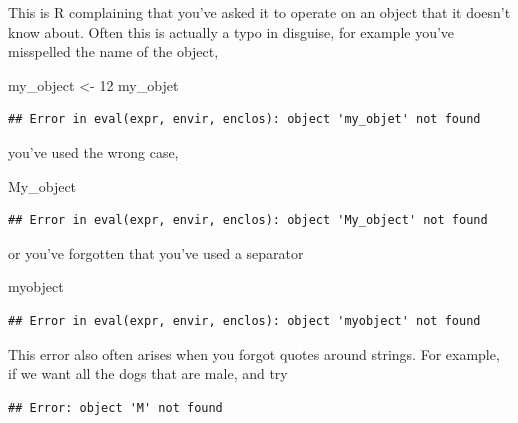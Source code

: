 \documentclass[]{Nemilov}
\newenvironment{Shaded}{\begin{snugshade}}{\end{snugshade}}
\newcommand{\DecValTok}[1]{\textcolor[rgb]{0.00,0.00,0.81}{#1}}
\newcommand{\KeywordTok}[1]{\textcolor[rgb]{0.13,0.29,0.53}{\textbf{#1}}}
\newcommand{\NormalTok}[1]{#1}
\newcommand{\OperatorTok}[1]{\textcolor[rgb]{0.81,0.36,0.00}{\textbf{#1}}}
\newcommand{\StringTok}[1]{\textcolor[rgb]{0.31,0.60,0.02}{#1}}
\begin{document}
This is R complaining that you've asked it to operate on an object that it doesn't know about. Often this is actually a typo in disguise, for example you've misspelled the name of the object,

\begin{Shaded}
\begin{Highlighting}[]
\NormalTok{my_object <-}\StringTok{ }\DecValTok{12}
\NormalTok{my_objet}
\end{Highlighting}
\end{Shaded}

\begin{verbatim}
## Error in eval(expr, envir, enclos): object 'my_objet' not found
\end{verbatim}

you've used the wrong case,

\begin{Shaded}
\begin{Highlighting}[]
\NormalTok{My_object}
\end{Highlighting}
\end{Shaded}

\begin{verbatim}
## Error in eval(expr, envir, enclos): object 'My_object' not found
\end{verbatim}

or you've forgotten that you've used a separator

\begin{Shaded}
\begin{Highlighting}[]
\NormalTok{myobject}
\end{Highlighting}
\end{Shaded}

\begin{verbatim}
## Error in eval(expr, envir, enclos): object 'myobject' not found
\end{verbatim}

This error also often arises when you forgot quotes around strings. For example, if we want all the dogs that are male, and try

\begin{Shaded}
\end{Shaded}

\begin{verbatim}
## Error: object 'M' not found
\end{verbatim}
\end{document}
